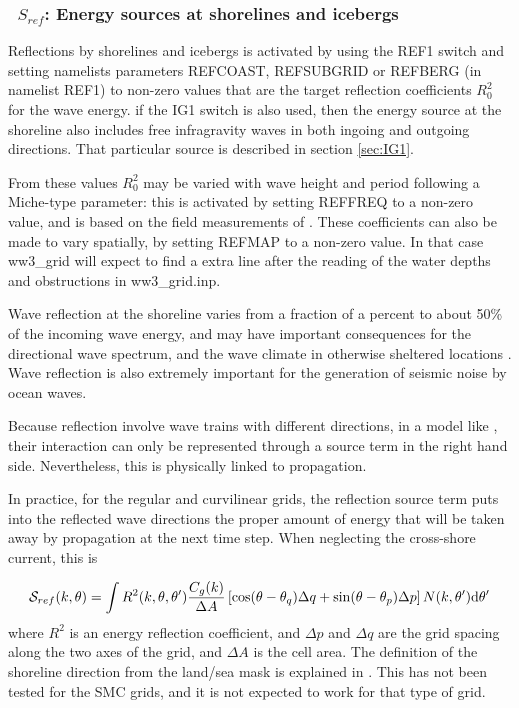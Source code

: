 \vsssub
\subsubsection{~$S_{ref}$: Energy sources at shorelines and icebergs} \label{sec:REF1}
\vsssub


\noindent 
Reflections by shorelines and icebergs is activated by using the REF1 switch 
and setting namelists
parameters REFCOAST, REFSUBGRID or REFBERG (in namelist REF1) to non-zero
values that are the target reflection coefficients $R_0^2$ for the wave
energy.  if the IG1 switch is also used, then the energy source at the shoreline 
also includes free infragravity waves in both ingoing and outgoing directions. 
That particular source is described in section \ref{sec:IG1}.


From these values $R_0^2$ may be varied with wave height and period
following a Miche-type parameter: this is activated by setting REFFREQ to a
non-zero value, and is based on the field measurements of \cite{art:EHG94}.
These coefficients can also be made to vary spatially, by setting REFMAP to a
non-zero value. In that case ww3\_grid will expect to find a extra line after
the reading of the water depths and obstructions in ww3\_grid.inp.

Wave reflection at the shoreline varies from a fraction of a percent to about
50\% of the incoming wave energy, and may have important consequences for the
directional wave spectrum, and the wave climate in otherwise sheltered
locations \citep{pro:ORe99}. Wave reflection is also extremely important for
the generation of seismic noise by ocean waves.

Because reflection involve wave trains with different directions, in a model
like \ws, their interaction can only be represented through a source term in
the right hand side. Nevertheless, this is physically linked to propagation.

In practice, for the regular and curvilinear grids, the reflection source term puts into the
reflected wave directions the proper amount of energy that will be taken away
by propagation at the next time step. When neglecting the cross-shore current,
this is

\begin{equation} 
{\cal S}_{ref}(k,\theta) = 
\int R^2(k,\theta,\theta') \frac{C_g(k)}{\Delta A} \left[\cos (\theta-\theta_q) \Delta q + \sin (\theta-\theta_p)  \Delta p \right] N(k,\theta') \mathrm{d} \theta'
\end{equation}
where $R^2$ is an energy reflection coefficient, and $\Delta p$ and $\Delta q$
are the grid spacing along the two axes of the grid,  and $\Delta A$ is the cell area. The
definition of the shoreline direction from the land/sea mask is explained in
\cite{art:Aea11}. This has not been tested for the SMC grids, and it is not expected to work for 
that type of grid.  

